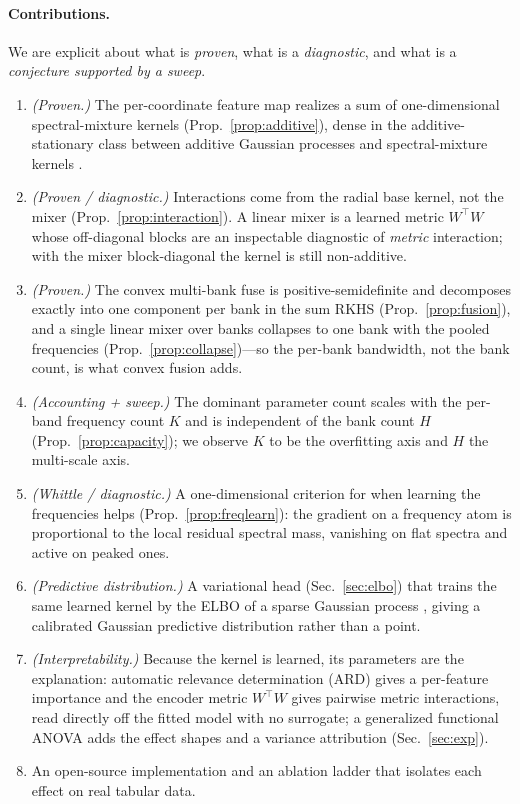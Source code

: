 \documentclass[11pt]{article}
\theoremstyle{definition}
\begin{document}
\paragraph{Contributions.} We are explicit about what is \emph{proven}, what is a
\emph{diagnostic}, and what is a \emph{conjecture supported by a sweep}.
\begin{enumerate}\itemsep2pt
\item \emph{(Proven.)} The per-coordinate feature map realizes a sum of one-dimensional
spectral-mixture kernels (Prop.~\ref{prop:additive}), dense in the additive-stationary class
between additive Gaussian processes \citep{duvenaud2011} and spectral-mixture kernels
\citep{wilson2013}.
\item \emph{(Proven / diagnostic.)} Interactions come from the radial base kernel, not the
mixer (Prop.~\ref{prop:interaction}). A linear mixer is a learned metric $W^\top W$ whose
off-diagonal blocks are an inspectable diagnostic of \emph{metric} interaction; with the mixer
block-diagonal the kernel is still non-additive.
\item \emph{(Proven.)} The convex multi-bank fuse is positive-semidefinite and decomposes
exactly into one component per bank in the sum RKHS (Prop.~\ref{prop:fusion}), and a single
linear mixer over banks collapses to one bank with the pooled frequencies
(Prop.~\ref{prop:collapse})---so the per-bank bandwidth, not the bank count, is what convex
fusion adds.
\item \emph{(Accounting + sweep.)} The dominant parameter count scales with the per-band
frequency count $K$ and is independent of the bank count $H$ (Prop.~\ref{prop:capacity}); we
observe $K$ to be the overfitting axis and $H$ the multi-scale axis.
\item \emph{(Whittle / diagnostic.)} A one-dimensional criterion for when learning the
frequencies helps (Prop.~\ref{prop:freqlearn}): the gradient on a frequency atom is
proportional to the local residual spectral mass, vanishing on flat spectra and active on
peaked ones.
\item \emph{(Predictive distribution.)} A variational head (Sec.~\ref{sec:elbo}) that trains the
same learned kernel by the ELBO of a sparse Gaussian process \citep{titsias2009,hensman2013},
giving a calibrated Gaussian predictive distribution rather than a point.
\item \emph{(Interpretability.)} Because the kernel is learned, its parameters are the
explanation: automatic relevance determination (ARD) gives a per-feature importance and the encoder metric $W^\top W$ gives
pairwise metric interactions, read directly off the fitted model with no surrogate; a generalized
functional ANOVA \citep{hooker2007} adds the effect shapes and a variance attribution
(Sec.~\ref{sec:exp}).
\item An open-source implementation and an ablation ladder that isolates each effect on real
tabular data.
\end{enumerate}
\end{document}
